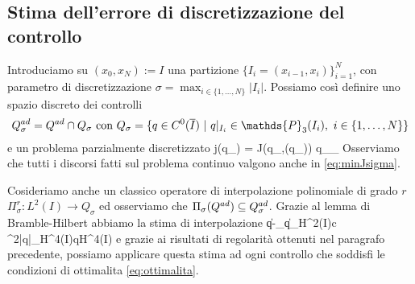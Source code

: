 \subsection{Stima dell'errore di discretizzazione del controllo}

Introduciamo su $(x_0,x_N):=I$ una partizione $\{I_i=(x_{i-1},x_i)\}_{i=1}^N$, con parametro di discretizzazione $\sigma=\max_{i\in\{1,\dots,N\}}|I_i|$. Possiamo così definire uno spazio discreto dei controlli
$$ \Q_\sigma = \Q\cap Q_\sigma\text{  con  }Q_\sigma=\{q\in C^0(\overline{I})\ | \ q|_{I_i}\in\mathds{P}_3(I_i),\ i\in\{1,\dots,N\}\} $$
e un problema parzialmente discretizzato
\beq
	 j(q_\sigma) = J(q_\sigma,(q_\sigma)) q_\sigma\in\Q_\sigma
\label{eq:minJsigma}
\eeq
Osserviamo che tutti i discorsi fatti sul problema continuo valgono anche in \eqref{eq:minJsigma}.

Cosideriamo anche un classico operatore di interpolazione polinomiale di grado $r$ $\Pi^r_\sigma\colon L^2(I)\to Q_\sigma$ ed osserviamo che $\Pi_\sigma(Q^{ad})\subseteq Q^{ad}_\sigma$. Grazie al lemma di Bramble-Hilbert abbiamo la stima di interpolazione
\beq
	\|q-\Pi_\sigma q\|_{H^2(I)}\leq c \sigma^2|q|_{H^4(I)}\quad\forall q\in H^4(I)
\label{eq:qinterp}
\eeq
e grazie ai risultati di regolarità ottenuti nel paragrafo precedente, possiamo applicare questa stima ad ogni controllo che soddisfi le condizioni di ottimalita \eqref{eq:ottimalita}.\\


